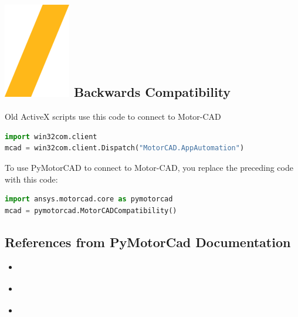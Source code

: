 \documentclass[landscape]{article}
\begin{document}
\begin{multicols}{3}
\section{\includegraphics[height=\fontcharht\font`\S]{slash.png} Backwards Compatibility}
Old ActiveX scripts use this code to connect to Motor-CAD
\begin{lstlisting}[language=Python]
import win32com.client
mcad = win32com.client.Dispatch("MotorCAD.AppAutomation")
\end{lstlisting}
To use PyMotorCAD to connect to Motor-CAD, you replace the preceding code with this code:	
\begin{lstlisting}[language=Python]
import ansys.motorcad.core as pymotorcad
mcad = pymotorcad.MotorCADCompatibility()
\end{lstlisting}	
\subsection{References from PyMotorCad Documentation}
\begin{center}
\begin{itemize}
\item \href{https://motorcad.docs.pyansys.com/version/stable/getting_started/index.html}{\color{blue}{Getting Started}}
\item \href{https://motorcad.docs.pyansys.com/version/stable/examples/index.html}{\color{blue}{Examples}}
\item \href{https://motorcad.docs.pyansys.com/version/stable/methods/index.html}{\color{blue}{API Reference}}
\end{itemize}

\end{center}
\end{multicols}
\noindent\makebox[\linewidth]{\rule{\paperwidth}{4pt}}
\end{document}
